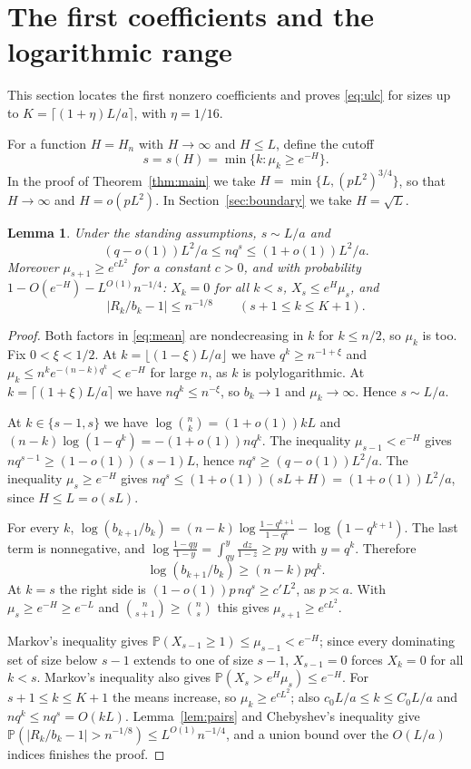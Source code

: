 \documentclass[11pt]{article}
\newtheorem{lemma}[theorem]{Lemma}
\theoremstyle{remark}
\newcommand{\PP}{\mathbb P}
\begin{document}
\section{The first coefficients and the logarithmic range}\label{sec:onset}
This section locates the first nonzero coefficients and proves \eqref{eq:ulc} for sizes up to $K=\lceil(1+\eta)L/a\rceil$, with $\eta=1/16$.

For a function $H=H_n$ with $H\to\infty$ and $H\le L$, define the cutoff
\[
 s=s(H)=\min\{k:\mu_k\ge e^{-H}\}.
\]
In the proof of Theorem~\ref{thm:main} we take $H=\min\{L,(pL^2)^{3/4}\}$, so that $H\to\infty$ and $H=o(pL^2)$. In Section~\ref{sec:boundary} we take $H=\sqrt L$.

\begin{lemma}\label{lem:cutoff}
Under the standing assumptions, $s\sim L/a$ and
\[
 (q-o(1))L^2/a\le nq^s\le(1+o(1))L^2/a .
\]
Moreover $\mu_{s+1}\ge e^{cL^2}$ for a constant $c>0$, and with probability $1-O(e^{-H})-L^{O(1)}n^{-1/4}$: $X_k=0$ for all $k<s$, $X_s\le e^H\mu_s$, and
\[
 |R_k/b_k-1|\le n^{-1/8}\qquad(s+1\le k\le K+1).
\]
\end{lemma}
\begin{proof}
Both factors in \eqref{eq:mean} are nondecreasing in $k$ for $k\le n/2$, so $\mu_k$ is too. Fix $0<\xi<1/2$. At $k=\lfloor(1-\xi)L/a\rfloor$ we have $q^k\ge n^{-1+\xi}$ and $\mu_k\le n^ke^{-(n-k)q^k}<e^{-H}$ for large $n$, as $k$ is polylogarithmic. At $k=\lceil(1+\xi)L/a\rceil$ we have $nq^k\le n^{-\xi}$, so $b_k\to1$ and $\mu_k\to\infty$. Hence $s\sim L/a$.

At $k\in\{s-1,s\}$ we have $\log\binom nk=(1+o(1))kL$ and $(n-k)\log(1-q^k)=-(1+o(1))nq^k$. The inequality $\mu_{s-1}<e^{-H}$ gives $nq^{s-1}\ge(1-o(1))(s-1)L$, hence $nq^s\ge(q-o(1))L^2/a$. The inequality $\mu_s\ge e^{-H}$ gives $nq^s\le(1+o(1))(sL+H)=(1+o(1))L^2/a$, since $H\le L=o(sL)$.

For every $k$, $\log(b_{k+1}/b_k)=(n-k)\log\frac{1-q^{k+1}}{1-q^k}-\log(1-q^{k+1})$. The last term is nonnegative, and $\log\frac{1-qy}{1-y}=\int_{qy}^{y}\frac{dz}{1-z}\ge py$ with $y=q^k$. Therefore
\begin{equation}
 \log(b_{k+1}/b_k)\ge(n-k)pq^k .
 \label{eq:jump}
\end{equation}
At $k=s$ the right side is $(1-o(1))p\,nq^s\ge c'L^2$, as $p\asymp a$. With $\mu_s\ge e^{-H}\ge e^{-L}$ and $\binom n{s+1}\ge\binom ns$ this gives $\mu_{s+1}\ge e^{cL^2}$.

Markov's inequality gives $\PP(X_{s-1}\ge1)\le\mu_{s-1}<e^{-H}$; since every dominating set of size below $s-1$ extends to one of size $s-1$, $X_{s-1}=0$ forces $X_k=0$ for all $k<s$. Markov's inequality also gives $\PP(X_s>e^H\mu_s)\le e^{-H}$. For $s+1\le k\le K+1$ the means increase, so $\mu_k\ge e^{cL^2}$; also $c_0L/a\le k\le C_0L/a$ and $nq^k\le nq^s=O(kL)$. Lemma~\ref{lem:pairs} and Chebyshev's inequality give $\PP(|R_k/b_k-1|>n^{-1/8})\le L^{O(1)}n^{-1/4}$, and a union bound over the $O(L/a)$ indices finishes the proof.
\end{proof}
\end{document}
